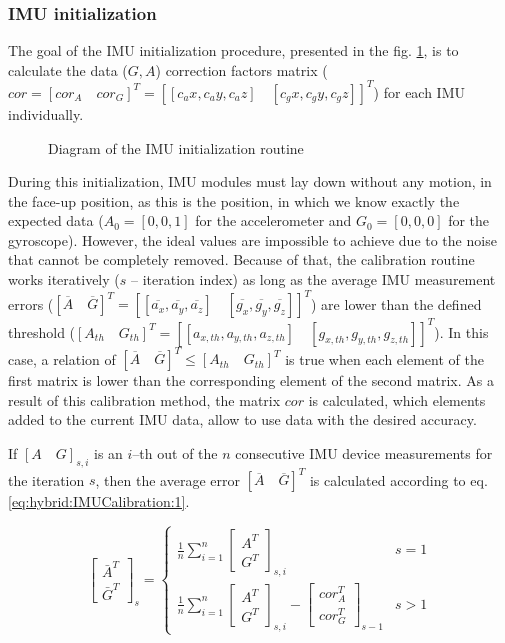\documentclass[sensors,article,submit,moreauthors,pdftex,10pt,a4paper]{mdpi}
\begin{document}
\subsubsection{IMU initialization}
The goal of the IMU initialization procedure, presented in the fig. \ref{fig:hybrid:IMUCalibration}, is to calculate the data ($G, A$) correction factors matrix ($cor = [cor_A \quad cor_G]^T = [[c_ax,c_ay,c_az ]\quad[c_gx,c_gy,c_gz ]]^T $) for each IMU individually. 
	
\begin{figure}[!htb] %
	\scalebox{0.55}{		
		
	}
	\caption{Diagram of the IMU initialization routine}
	\label{fig:hybrid:IMUCalibration}
\end{figure}
	
During this initialization, IMU modules must lay down without any motion, in the face-up position, as this is the position, in which we know exactly the expected data ($A_0=[0,0,1]$ for the accelerometer and $G_0=[0,0,0]$ for the gyroscope). However, the ideal values are impossible to achieve due to the noise that cannot be completely removed. Because of that, the calibration routine works iteratively ($s$ -- iteration index) as long as the average IMU measurement errors ($[\overline{A}\quad \overline{G}]^T = [[\overline{a_x},\overline{a_y},\overline{a_z}]\quad[\overline{g_x},\overline{g_y},\overline{g_z}]]^T$) are lower than the defined threshold ($[A_{th}\quad G_{th}]^T = [[a_{x,th},a_{y,th},a_{z,th}]\quad[g_{x,th},g_{y,th},g_{z,th}]]^T$). In this case, a relation of $[\overline{A}\quad \overline{G}]^T \le [A_{th}\quad G_{th}]^T$ is true when each element of the first matrix is lower than the corresponding element of the second matrix. As a result of this calibration method, the matrix $cor$ is calculated, which elements added to the current IMU data, allow to use data with the desired accuracy. 
		
If $[A\quad G]_{s,i}$ is an $i$--th out of the $n$ consecutive IMU device measurements for the iteration $s$, then the average error $[\overline{A}\quad \overline{G}]^T$ is calculated according to eq. \ref{eq:hybrid:IMUCalibration:1}.
		
\begin{equation}
	\begin{bmatrix} \bar{A}^T \\ \bar{G}^T \end{bmatrix}_s =
	\begin{cases}
		\frac{1}{n}\sum_{i=1}^{n}{\begin{bmatrix}A^T \\ G^T\end{bmatrix}_{s,i}} & s = 1\\
		\frac{1}{n}\sum_{i=1}^{n}{\begin{bmatrix}A^T \\ G^T\end{bmatrix}_{s,i} - \begin{bmatrix}cor_A^T\\ cor_G^T\end{bmatrix}_{s-1}} &  s > 1
	\end{cases}
	\label{eq:hybrid:IMUCalibration:1}
\end{equation}
	
\end{document}

